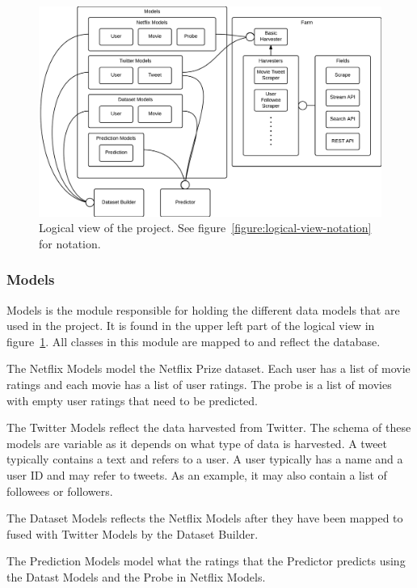 \begin{center}
\begin{figure}[H]
\centerline{\includegraphics[width=7in]{image/architecture-logical-view.png}}
\caption[Logical view]{Logical view of the project. See figure~\ref{figure:logical-view-notation} for notation.}
\label{figure:logical-view}
\end{figure}
\end{center}

\subsubsection{Models}
Models is the module responsible for holding the different data models that are used in the project. It is found in the upper left part of the logical view in figure~\ref{figure:logical-view}. All classes in this module are mapped to and reflect the database.

The Netflix Models model the Netflix Prize dataset. Each user has a list of movie ratings and each movie has a list of user ratings. The probe is a list of movies with empty user ratings that need to be predicted.

The Twitter Models reflect the data harvested from Twitter. The schema of these models are variable as it depends on what type of data is harvested. A tweet typically contains a text and refers to a user. A user typically has a name and a user ID and may refer to tweets. As an example, it may also contain a list of followees or followers.

The Dataset Models reflects the Netflix Models after they have been mapped to fused with Twitter Models by the Dataset Builder.

The Prediction Models model what the ratings that the Predictor predicts using the Datast Models and the Probe in Netflix Models.

